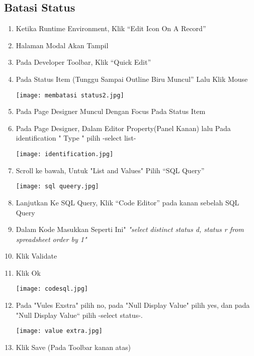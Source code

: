 \documentclass[a4paper,12pt]{report}
\begin{document}
\subsection{Batasi Status}
\begin{enumerate}
    \item Ketika Runtime Environment, Klik “Edit Icon On A Record”
    \item Halaman Modal Akan Tampil
    \item Pada Developer Toolbar, Klik “Quick Edit”
    \item Pada Status Item (Tunggu Sampai Outline Biru Muncul” Lalu Klik Mouse
     \begin{center}
    \texttt{[image: membatasi status2.jpg]}
    \end{center}
    \item Pada Page Designer Muncul Dengan Focus Pada Status Item
    \item Pada Page Designer, Dalam Editor Property(Panel Kanan) lalu Pada identification " Type " pilih -select list-
     \begin{center}
    \texttt{[image: identification.jpg]}
    \end{center}
    \item Scroll ke bawah, Untuk "List and Values" Pilih “SQL Query”
     \begin{center}
    \texttt{[image: sql queery.jpg]}
    \end{center}
    \item Lanjutkan Ke SQL Query, Klik “Code Editor” pada kanan sebelah SQL Query
    \item Dalam Kode Masukkan Seperti Ini"
    \textit{"select distinct status d, status r from spreadsheet order by 1"}
    \item Klik Validate
    \item Klik Ok
     \begin{center}
    \texttt{[image: codesql.jpg]}
    \end{center}
    \item Pada "Vules Exstra" pilih no, pada "Null Display Value" pilih yes, dan pada "Null Display Value“ pilih -select status-.
      \begin{center}
    \texttt{[image: value extra.jpg]}
    \end{center}
    \item Klik Save (Pada Toolbar kanan atas)
\end{enumerate}
\end{document}
